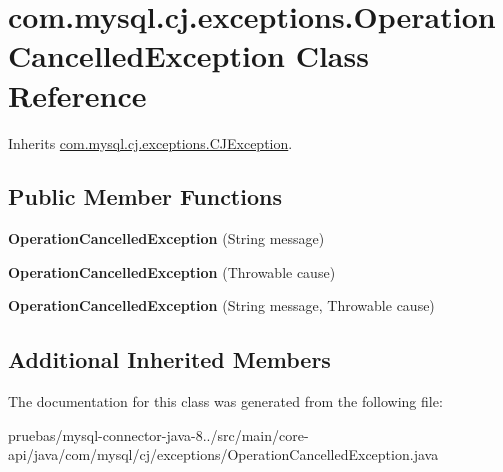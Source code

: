 \hypertarget{classcom_1_1mysql_1_1cj_1_1exceptions_1_1_operation_cancelled_exception}{}\section{com.\+mysql.\+cj.\+exceptions.\+Operation\+Cancelled\+Exception Class Reference}
\label{classcom_1_1mysql_1_1cj_1_1exceptions_1_1_operation_cancelled_exception}


Inherits \mbox{\hyperlink{classcom_1_1mysql_1_1cj_1_1exceptions_1_1_c_j_exception}{com.\+mysql.\+cj.\+exceptions.\+C\+J\+Exception}}.

\subsection*{Public Member Functions}
\begin{DoxyCompactItemize}
\item 
\mbox{\label{classcom_1_1mysql_1_1cj_1_1exceptions_1_1_operation_cancelled_exception_a238f1d33cf129cf47a623bc472ea03cd}} 
{\bfseries Operation\+Cancelled\+Exception} (String message)
\item 
\mbox{\label{classcom_1_1mysql_1_1cj_1_1exceptions_1_1_operation_cancelled_exception_a24ff42dc168e6f3f3852458e03febab7}} 
{\bfseries Operation\+Cancelled\+Exception} (Throwable cause)
\item 
\mbox{\label{classcom_1_1mysql_1_1cj_1_1exceptions_1_1_operation_cancelled_exception_ad03b2b5c0bbee8a9cd0f3f50bd317eb3}} 
{\bfseries Operation\+Cancelled\+Exception} (String message, Throwable cause)
\end{DoxyCompactItemize}
\subsection*{Additional Inherited Members}


The documentation for this class was generated from the following file\+:\begin{DoxyCompactItemize}
\item 
pruebas/mysql-\/connector-\/java-\/8../src/main/core-\/api/java/com/mysql/cj/exceptions/Operation\+Cancelled\+Exception.\+java\end{DoxyCompactItemize}
